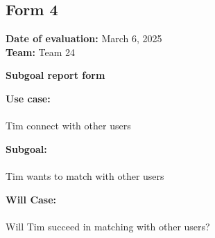 \documentclass[12pt, titlepage]{article}
\begin{document}
\subsection{Form 4}

\noindent \textbf{Date of evaluation:} March 6, 2025\\
\textbf{Team:} Team 24

\vspace{0.5cm}
\noindent \textbf{\large Subgoal report form}

\vspace{0.3cm}
\noindent \textbf{Use case:} \\\\
Tim connect with other users


\vspace{0.5cm}
\noindent \textbf{Subgoal:} \\\\
Tim wants to match with other users

\vspace{0.5cm}
\noindent \textbf{Will Case:} \\\\
Will Tim succeed in matching with other users?
\end{document}
